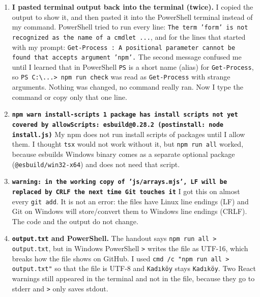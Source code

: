 \documentclass[
  10pt,
]{article}
\begin{document}
\begin{enumerate}
  \texttt{npm run check} said:
  \texttt{ts/\allowbreak{}arrays.\allowbreak{}ts:\allowbreak{}16:\allowbreak{}24 - error TS18048:\allowbreak{} 'firstStop' is possibly 'undefined'.\allowbreak{}}
  It is the same \texttt{undefined} as in entry 2, but TypeScript finds
  it before the code runs, because \texttt{noUncheckedIndexedAccess} is
  on and a \texttt{string[\allowbreak{}]} can be shorter than the
  pattern. I put the \texttt{??} back.
\item
  \textbf{I pasted terminal output back into the terminal (twice).} I
  copied the output to show it, and then pasted it into the PowerShell
  terminal instead of my command. PowerShell tried to run every line:
  \texttt{The term 'form' is not recognized as the name of a cmdlet .\allowbreak{}.\allowbreak{}.\allowbreak{}},
  and for the lines that started with my prompt:
  \texttt{Get-Process :\allowbreak{} A positional parameter cannot be found that accepts argument 'npm'.\allowbreak{}}
  The second message confused me until I learned that in PowerShell
  \texttt{PS} is a short name (alias) for \texttt{Get-Process}, so
  \texttt{PS C:\allowbreak{}\textbackslash{}.\allowbreak{}.\allowbreak{}.\allowbreak{}> npm run check}
  was read as \texttt{Get-Process} with strange arguments. Nothing was
  changed, no command really ran. Now I type the command or copy only
  that one line.
\item
  \textbf{\texttt{npm warn install-scripts 1 package has install scripts not yet covered by allowScripts:\allowbreak{} esbuild@0.\allowbreak{}28.\allowbreak{}2 (\allowbreak{}postinstall:\allowbreak{} node install.\allowbreak{}js)}}
  My npm does not run install scripts of packages until I allow them. I
  thought \texttt{tsx} would not work without it, but
  \texttt{npm run all} worked, because esbuild\textquotesingle s Windows
  binary comes as a separate optional package
  (\texttt{@esbuild/\allowbreak{}win32-x64}) and does not need that
  script.
\item
  \textbf{\texttt{warning:\allowbreak{} in the working copy of 'js/\allowbreak{}arrays.\allowbreak{}mjs',\allowbreak{} LF will be replaced by CRLF the next time Git touches it}}
  I got this on almost every \texttt{git add}. It is not an error: the
  files have Linux line endings (LF) and Git on Windows will
  store/convert them to Windows line endings (CRLF). The code and the
  output do not change.
\item
  \textbf{\texttt{output.\allowbreak{}txt} and PowerShell.} The handout
  says \texttt{npm run all > output.\allowbreak{}txt}, but in Windows
  PowerShell \texttt{>} writes the file as UTF-16, which breaks how the
  file shows on GitHub. I used
  \texttt{cmd /\allowbreak{}c "npm run all > output.\allowbreak{}txt"}
  so that the file is UTF-8 and \texttt{Kadıköy} stays \texttt{Kadıköy}.
  Two React warnings still appeared in the terminal and not in the file,
  because they go to stderr and \texttt{>} only saves stdout.
\end{enumerate}
\end{document}

